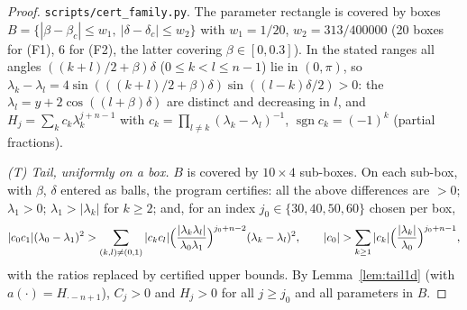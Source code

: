 \documentclass[11pt,a4paper]{article}
\theoremstyle{definition}
\newcommand{\sgn}{\operatorname{sgn}}
\begin{document}
\begin{proof}
\texttt{scripts/cert\_family.py}. The parameter rectangle is covered by boxes $B=\{|\beta-\beta_c|\le w_1,\ |\delta-\delta_c|\le w_2\}$ with $w_1=1/20$, $w_2=313/400000$ (20 boxes for (F1), 6 for (F2), the latter covering $\beta\in[0,0.3]$). In the stated ranges all angles $((k+l)/2+\beta)\delta$ ($0\le k<l\le n-1$) lie in $(0,\pi)$, so $\lambda_k-\lambda_l=4\sin(((k+l)/2+\beta)\delta)\sin((l-k)\delta/2)>0$: the $\lambda_l=y+2\cos((l+\beta)\delta)$ are distinct and decreasing in $l$, and $H_j=\sum_kc_k\lambda_k^{j+n-1}$ with $c_k=\prod_{l\ne k}(\lambda_k-\lambda_l)^{-1}$, $\sgn c_k=(-1)^k$ (partial fractions).

\emph{(T) Tail, uniformly on a box.} $B$ is covered by $10\times4$ sub-boxes. On each sub-box, with $\beta$, $\delta$ entered as balls, the program certifies: all the above differences are $>0$; $\lambda_1>0$; $\lambda_1>|\lambda_k|$ for $k\ge2$; and, for an index $j_0\in\{30,40,50,60\}$ chosen per box,
\[
|c_0c_1|(\lambda_0-\lambda_1)^2>\sum_{(k,l)\ne(0,1)}|c_kc_l|\Bigl(\frac{|\lambda_k\lambda_l|}{\lambda_0\lambda_1}\Bigr)^{j_0+n-2}(\lambda_k-\lambda_l)^2,\qquad|c_0|>\sum_{k\ge1}|c_k|\Bigl(\frac{|\lambda_k|}{\lambda_0}\Bigr)^{j_0+n-1},
\]
with the ratios replaced by certified upper bounds. By Lemma~\ref{lem:tail1d} (with $a(\cdot)=H_{\cdot-n+1}$), $C_j>0$ and $H_j>0$ for all $j\ge j_0$ and all parameters in $B$.


\end{proof}
\end{document}
